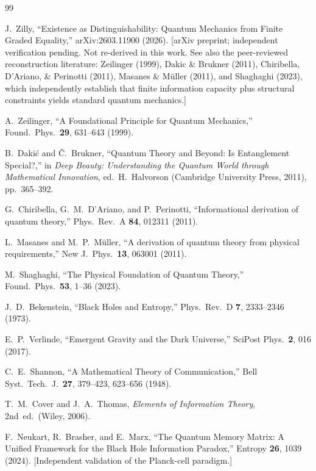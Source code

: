 \documentclass[aps,prd,twocolumn,showpacs,superscriptaddress,preprintnumbers]{revtex4-2}
\begin{document}

\begin{thebibliography}{99}

J.~Zilly, ``Existence as Distinguishability: Quantum Mechanics from Finite Graded Equality,''
arXiv:2603.11900 (2026).
[arXiv preprint; independent verification pending. Not re-derived in this work.
See also the peer-reviewed reconstruction literature: Zeilinger (1999), Dakic \& Brukner (2011),
Chiribella, D'Ariano, \& Perinotti (2011), Masanes \& M\"uller (2011), and Shaghaghi (2023),
which independently establish that finite information capacity plus structural constraints yields
standard quantum mechanics.]

A.~Zeilinger, ``A Foundational Principle for Quantum Mechanics,''
Found.\ Phys.\ \textbf{29}, 631--643 (1999).

B.~Daki\'c and \v{C}.~Brukner, ``Quantum Theory and Beyond: Is Entanglement Special?,''
in \emph{Deep Beauty: Understanding the Quantum World through Mathematical Innovation},
ed.\ H.~Halvorson (Cambridge University Press, 2011), pp.\ 365--392.

G.~Chiribella, G.~M.~D'Ariano, and P.~Perinotti,
``Informational derivation of quantum theory,''
Phys.\ Rev.\ A \textbf{84}, 012311 (2011).

L.~Masanes and M.~P.~M\"uller,
``A derivation of quantum theory from physical requirements,''
New J.\ Phys.\ \textbf{13}, 063001 (2011).

M.~Shaghaghi, ``The Physical Foundation of Quantum Theory,''
Found.\ Phys.\ \textbf{53}, 1--36 (2023).

J.~D.~Bekenstein, ``Black Holes and Entropy,''
Phys.\ Rev.\ D \textbf{7}, 2333--2346 (1973).

E.~P.~Verlinde, ``Emergent Gravity and the Dark Universe,''
SciPost Phys.\ \textbf{2}, 016 (2017).

C.~E.~Shannon, ``A Mathematical Theory of Communication,''
Bell Syst.~Tech.~J.~\textbf{27}, 379--423, 623--656 (1948).

T.~M.~Cover and J.~A.~Thomas, \emph{Elements of Information Theory}, 2nd~ed.\ (Wiley, 2006).

F.~Neukart, R.~Brasher, and E.~Marx,
``The Quantum Memory Matrix: A Unified Framework for the Black Hole Information Paradox,''
Entropy \textbf{26}, 1039 (2024).
[Independent validation of the Planck-cell paradigm.]


\end{thebibliography}
\end{document}
